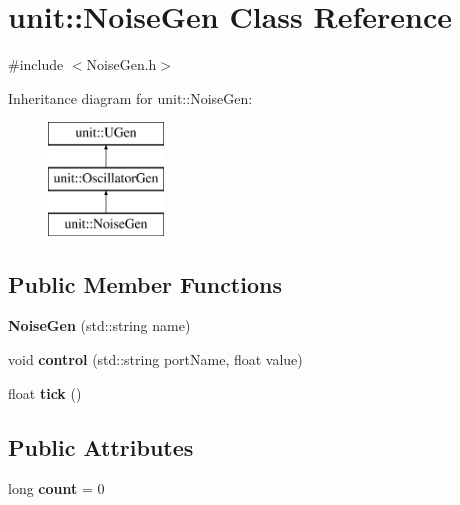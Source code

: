 \hypertarget{classunit_1_1NoiseGen}{\section{unit\-:\-:Noise\-Gen Class Reference}
\label{classunit_1_1NoiseGen}
}


{\ttfamily \#include $<$Noise\-Gen.\-h$>$}

Inheritance diagram for unit\-:\-:Noise\-Gen\-:\begin{figure}[H]
\begin{center}
\leavevmode
\includegraphics[height=3.000000cm]{classunit_1_1NoiseGen}
\end{center}
\end{figure}
\subsection*{Public Member Functions}
\begin{DoxyCompactItemize}
\item 
\hypertarget{classunit_1_1NoiseGen_aa49d8817fff2757abc19f0dffea0c7fe}{{\bfseries Noise\-Gen} (std\-::string name)}\label{classunit_1_1NoiseGen_aa49d8817fff2757abc19f0dffea0c7fe}

\item 
\hypertarget{classunit_1_1NoiseGen_a73628ae13d893658b88bc30eb43437ba}{void {\bfseries control} (std\-::string port\-Name, float value)}\label{classunit_1_1NoiseGen_a73628ae13d893658b88bc30eb43437ba}

\item 
\hypertarget{classunit_1_1NoiseGen_addaecf96df1cf9f1ba4875fb849949df}{float {\bfseries tick} ()}\label{classunit_1_1NoiseGen_addaecf96df1cf9f1ba4875fb849949df}

\end{DoxyCompactItemize}
\subsection*{Public Attributes}
\begin{DoxyCompactItemize}
\item 
\hypertarget{classunit_1_1NoiseGen_a9509da6dba8e294d3e5bc26d2eb6d39f}{long {\bfseries count} = 0}\label{classunit_1_1NoiseGen_a9509da6dba8e294d3e5bc26d2eb6d39f}

\end{DoxyCompactItemize}
